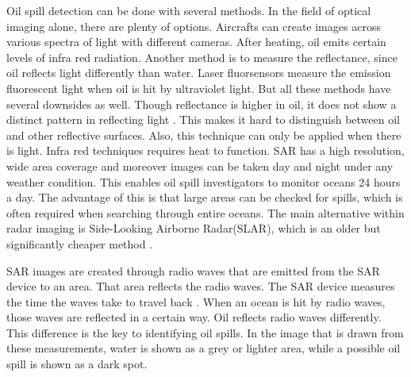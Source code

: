 Oil spill detection can be done with several methods. In the field of optical imaging alone, there are plenty of options. Aircrafts can create images across various spectra of light with different cameras. After heating, oil emits certain levels of infra red radiation. Another method is to measure the reflectance, since oil reflects light differently than water. Laser fluorsensors measure the emission fluorescent light when oil is hit by ultraviolet light. But all these methods have several downsides as well. Though reflectance is higher in oil, it does not show a distinct pattern in reflecting light \cite{fingas2014review}. This makes it hard to distinguish between oil and other reflective surfaces. Also, this technique can only be applied when there is light. Infra red techniques requires heat to function.
SAR has a high resolution, wide area coverage and moreover images can be taken day and night under any weather condition. This enables oil spill investigators to monitor oceans 24 hours a day\cite{Chang20081915}. The advantage of this is that large areas can be checked for spills, which is often required when searching through entire oceans. 
The main alternative within radar imaging is Side-Looking Airborne Radar(SLAR), which is an older but significantly cheaper method \cite{fingas2014review}. 

SAR images are created through radio waves that are emitted from the SAR device to an area. That area reflects the radio waves. The SAR device measures the time the waves take to travel back  \cite{Doerry:04}. When an ocean is hit by radio waves, those waves are reflected in a certain way. Oil reflects radio waves differently. This difference is the key to identifying oil spills.
In the image that is drawn from these measurements, water is shown as a grey or lighter area, while a possible oil spill is shown as a dark spot.